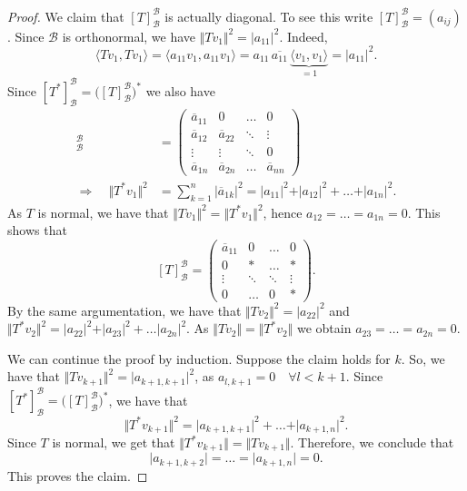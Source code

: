 \begin{proof}
	We claim that $[T]^{\mathcal{B}}_{\mathcal{B}}$ is actually diagonal. To see this write $[T]^{\mathcal{B}}_{\mathcal{B}} = (a_{ij})$. Since $\mathcal{B}$ is orthonormal, we have $\Vert Tv_1 \Vert^2 = \vert a_{11} \vert^2$. Indeed, 
	\[
		\langle Tv_1, Tv_1 \rangle = \langle a_{11}v_1, a_{11}v_1 \rangle = a_{11}\,\overline{a_{11}}\, \underbrace{\langle v_1, v_1\rangle}_{\displaystyle =1} = \vert a_{11}\vert^2.
	\] 
	Since $[T^*]^{\mathcal{B}}_{\mathcal{B}} = \big([T]^{\mathcal{B}}_{\mathcal{B}}\big)^*$ we also have
	\begin{align*}
		[T^*]^{\mathcal{B}}_{\mathcal{B}} &= \begin{pmatrix}
			\overline{a}_{11} & 0 & \hdots & 0\\
			\overline{a}_{12} & \overline{a}_{22} & \ddots & \vdots\\
			\vdots & \vdots & \ddots & 0\\
			\overline{a}_{1n} & \overline{a}_{2n} & \hdots & \overline{a}_{nn}
		\end{pmatrix}\\
		\Longrightarrow \quad \Vert T^* v_1 \Vert^2 &= \sum_{k=1}^{n} \vert \overline{a}_{1k} \vert^2 = \vert a_{11}\vert^2 + \vert a_{12}\vert^2 + \hdots + \vert a_{1n}\vert^2.
	\end{align*}
	As $T$ is normal, we have that $\Vert T v_1 \Vert^2 = \Vert T^*v_1 \Vert ^2$, hence $a_{12} = \hdots = a_{1n} = 0$. This shows that
	\[
		[T]^{\mathcal{B}}_{\mathcal{B}} = \begin{pmatrix}
			\overline{a}_{11} & 0 & \hdots & 0\\
			0 & \ast & \hdots & \ast\\
			\vdots & \ddots & \ddots & \vdots\\
			0 & \hdots & 0 & \ast
		\end{pmatrix}.
	\]
	By the same argumentation, we have that $\Vert Tv_2 \Vert^2 = \vert a_{22}\vert^2$ and $\Vert T^* v_2 \Vert^2 = \vert a_{22}\vert^2 + \vert a_{23} \vert^2 + \hdots \vert a_{2n}\vert^2$. As $\Vert Tv_2 \Vert = \Vert T^*v_2 \Vert$ we obtain $a_{23} = \hdots = a_{2n} = 0$. 
	
	We can continue the proof by induction. Suppose the claim holds for $k$. So, we have that $\Vert T v_{k+1} \Vert^2 = \vert a_{k+1,k+1}\vert^2$, as $a_{l, k+1} = 0 \quad \forall l < k+1$. Since $[T^*]^{\mathcal{B}}_{\mathcal{B}} = \big([T]^\mathcal{B}_{\mathcal{B}}\big)^*$, we have that 
	\[
		\Vert T^*v_{k+1} \Vert^2 = \vert a_{k+1, k+1}\vert^2 + \hdots + \vert a_{k+1, n}\vert^2.
	\]
	Since $T$ is normal, we get that $\Vert T^*v_{k+1}\Vert = \Vert Tv_{k+1}\Vert$. Therefore, we conclude that
	\[
		\vert a_{k+1, k+2}\vert = \hdots = \vert a_{k+1, n} \vert = 0.
	\]
	This proves the claim. \qedhere
\end{proof}

